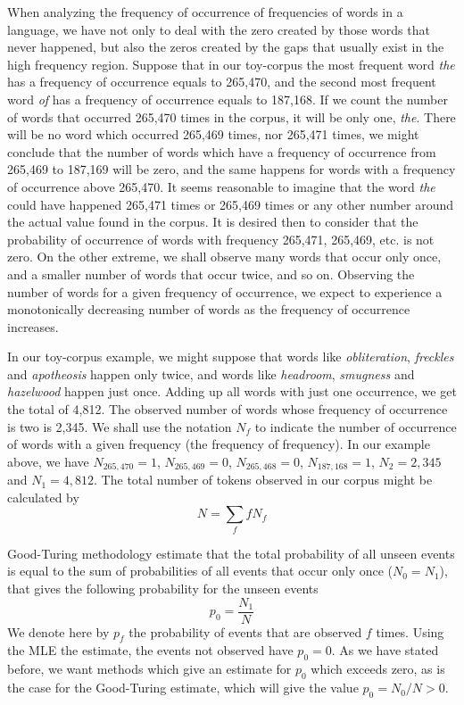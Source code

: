 When analyzing the frequency of occurrence of frequencies of words in a language, we have not only to 
deal with the zero created by those words that never happened, but also the zeros created by the gaps
that usually exist in the high frequency region. Suppose that in our toy-corpus the most frequent word
\textit{the} has a frequency of occurrence equals to 265,470, and the second most frequent word \textit{of}
has a frequency of occurrence equals to 187,168. If we count the number of words that occurred 265,470 times
in the corpus, it will be only one, \textit{the}. There will be no word which occurred 265,469 times,
nor 265,471 times, we might conclude that the number of words which have a frequency of occurrence 
from 265,469 to 187,169 will be zero, and the same happens for words with a frequency of occurrence above 265,470. 
It seems reasonable to imagine that the word \textit{the} could have
happened 265,471 times or 265,469 times or any other number around the actual value found in the corpus.
It is desired then to consider that the probability of occurrence of words
with frequency 265,471, 265,469, etc. is not zero. On the other extreme, we shall observe many
words that occur only once, and a smaller number of words that occur twice, and so on. 
Observing the number of words for a given frequency of occurrence, we expect to experience a monotonically
decreasing number of words as the frequency of occurrence increases. 

In our toy-corpus example, we might suppose that words like \textit{obliteration}, \textit{freckles} and 
\textit{apotheosis} happen only twice, and words like \textit{headroom}, \textit{smugness} and \textit{hazelwood} 
happen just once. Adding up all words with just one occurrence, we get the total of 4,812. The
observed number of words whose frequency of occurrence is two is 2,345.
We shall use the notation $N_f$ to indicate the number of occurrence of words with a given frequency 
(the frequency of frequency). In our example above, we have $N_{265,470} = 1$, $N_{265,469} = 0$, 
$N_{265,468} = 0$, $N_{187,168} = 1$, 
$N_{2} = 2,345$ and $N_{1} = 4,812$. The total number of tokens observed in our corpus might
be calculated by
\begin{equation}
N = \sum_{f} f N_f
\end{equation}

Good-Turing methodology estimate that the total probability of all unseen events is equal to the 
sum of probabilities of all events that occur only once ($N_0 = N_1$), that gives the following
probability for the unseen events
\begin{equation}
p_0 = \frac{N_1}{N}
\end{equation}
We denote here by $p_f$ the probability of events that are observed $f$ times. 
Using the MLE the estimate, the events not observed have $p_0 = 0$. As we have stated before,
we want methods which give an estimate for $p_0$ which exceeds zero, as is the case for
the Good-Turing estimate, which will give the value $p_0 = N_0 / N > 0$.

